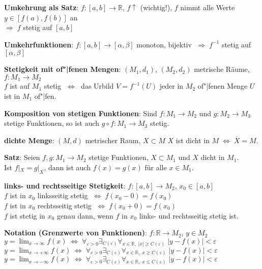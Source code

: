 \textbf{Umkehrung als Satz}: $f: [a,b] \rightarrow \mathbb{R}$,
$f\!\!\uparrow$ (wichtig!),
$f$ nimmt alle Werte $y \in [f(a), f(b)]$ an \\
$\Rightarrow\; f$ stetig auf $[a,b]$

\textbf{Umkehrfunktionen}:
$f: [a,b] \rightarrow [\alpha,\beta]$ monoton, bijektiv
$\;\Rightarrow\; f^{-1}$ stetig auf $[\alpha,\beta]$

\linie

\textbf{Stetigkeit mit of"|fenen Mengen}: $(M_1,d_1)$, $(M_2,d_2)$
metrische Räume, $f: M_1 \rightarrow M_2$ \\
$f$ ist auf $M_1$ stetig
$\;\Leftrightarrow\;$ das Urbild $V = f^{-1}(U)$ jeder in $M_2$ of"|fenen Menge
$U$ ist in $M_1$ of"|fen.

\textbf{Komposition von stetigen Funktionen}: Sind $f: M_1 \rightarrow M_2$ und
$g: M_2 \rightarrow M_3$ stetige Funktionen, so ist auch
$g \circ f: M_1 \rightarrow M_3$ stetig.

\linie

\textbf{dichte Menge}: $(M,d)$ metrischer Raum, $X \subset M$ \quad
$X$ ist dicht in $M \;\Leftrightarrow\; \overline{X} = M$.

\textbf{Satz}: Seien $f, g: M_1 \rightarrow M_2$ stetige Funktionen,
$X \subset M_1$ und $X$ dicht in $M_1$. \\
Ist $f|_X = g|_X$, dann ist auch $f(x) = g(x)$ für alle $x \in M_1$.

\textbf{links- und rechtsseitige Stetigkeit}:
$f: [a,b] \rightarrow M_2$, $x_0 \in [a,b]$ \\
$f$ ist in $x_0$ linksseitig stetig
$\;\Leftrightarrow\; f(x_0 - 0) = f(x_0)$ \\
$f$ ist in $x_0$ rechtsseitig stetig
$\;\Leftrightarrow\; f(x_0 + 0) = f(x_0)$ \\
$f$ ist stetig in $x_0$ genau dann, wenn $f$ in $x_0$ links- und rechtsseitig
stetig ist.

\textbf{Notation (Grenzwerte von Funktionen)}:
$f: \mathbb{R} \rightarrow M_2$, $y \in M_2$ \\
$y = \lim_{x \to \infty} f(x) \;\Leftrightarrow\;
\forall_{\varepsilon > 0} \exists_{C(\varepsilon)}
\forall_{x \in \mathbb{R},\; |x| \ge C(\varepsilon)}\;
|y - f(x)| < \varepsilon$ \\
$y = \lim_{x \to +\infty} f(x) \;\Leftrightarrow\;
\forall_{\varepsilon > 0} \exists_{C(\varepsilon)}
\forall_{x \in \mathbb{R},\; x \ge C(\varepsilon)}\;
|y - f(x)| < \varepsilon$ \\
$y = \lim_{x \to -\infty} f(x) \;\Leftrightarrow\;
\forall_{\varepsilon > 0} \exists_{C(\varepsilon)}
\forall_{x \in \mathbb{R},\; x \le C(\varepsilon)}\;
|y - f(x)| < \varepsilon$


